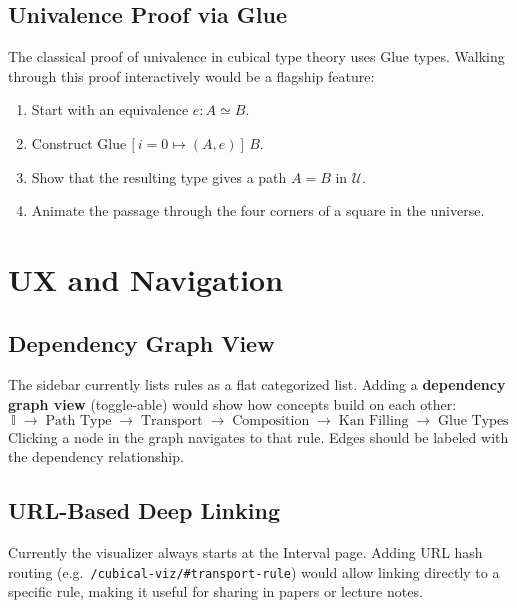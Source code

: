 \documentclass[11pt, a4paper]{article}
\begin{document}
\subsection{Univalence Proof via Glue}

The classical proof of univalence in cubical type theory uses Glue types. Walking
through this proof interactively would be a flagship feature:
\begin{enumerate}
  \item Start with an equivalence $e : A \simeq B$.
  \item Construct $\mathrm{Glue}\,[i=0 \mapsto (A, e)]\,B$.
  \item Show that the resulting type gives a path $A = B$ in $\mathcal{U}$.
  \item Animate the passage through the four corners of a square in the universe.
\end{enumerate}

\section{UX and Navigation}

\subsection{Dependency Graph View}

The sidebar currently lists rules as a flat categorized list. Adding a
\textbf{dependency graph view} (toggle-able) would show how concepts build on each
other:
\[
  \mathbb{I} \;\longrightarrow\; \text{Path Type} \;\longrightarrow\; \text{Transport} \;\longrightarrow\; \text{Composition} \;\longrightarrow\; \text{Kan Filling} \;\longrightarrow\; \text{Glue Types}
\]
Clicking a node in the graph navigates to that rule. Edges should be labeled with
the dependency relationship.

\subsection{URL-Based Deep Linking}

Currently the visualizer always starts at the Interval page. Adding URL hash routing
(e.g.\ \texttt{/cubical-viz/\#transport-rule}) would allow linking directly to a
specific rule, making it useful for sharing in papers or lecture notes.
\end{document}
